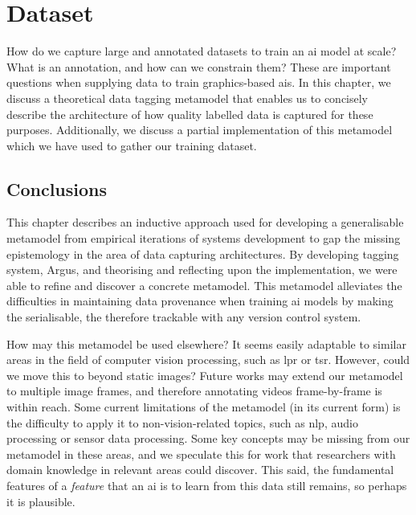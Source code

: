 \chapter{Dataset}
\label{ch:dataset}

How do we capture large and annotated datasets to train an \gls{ai} model at scale? What is an annotation, and how can we constrain them? These are important questions when supplying data to train graphics-based \glspl{ai}. In this chapter, we discuss a theoretical data tagging metamodel that enables us to concisely describe the architecture of how quality labelled data is captured for these purposes. Additionally, we discuss a partial implementation of this metamodel which we have used to gather our training dataset.







\section{Conclusions}

This chapter describes an inductive approach used for developing a generalisable metamodel from empirical iterations of systems development to gap the missing epistemology in the area of data capturing architectures. By developing tagging system, Argus, and theorising and reflecting upon the implementation, we were able to refine and discover a concrete metamodel. This metamodel alleviates the difficulties in maintaining data provenance when training \gls{ai} models by making the serialisable, the therefore trackable with any version control system.

How may this metamodel be used elsewhere? It seems easily adaptable to similar areas in the field of computer vision processing, such as \gls{lpr} or \gls{tsr}. However, could we move this to beyond static images? Future works may extend our metamodel to multiple image frames, and therefore annotating videos frame-by-frame is within reach. Some current limitations of the metamodel (in its current form) is the difficulty to apply it to non-vision-related topics, such as \gls{nlp}, audio processing or sensor data processing. Some key concepts may be missing from our metamodel in these areas, and we speculate this for work that researchers with domain knowledge in relevant areas could discover. This said, the fundamental features of a \textit{feature} that an \gls{ai} is to learn from this data still remains, so perhaps it is plausible.

